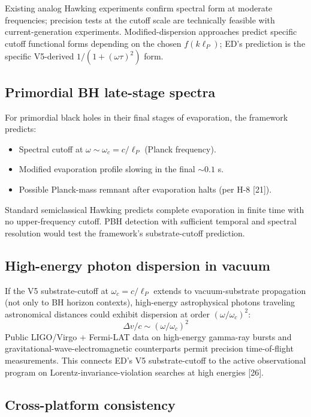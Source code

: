 \documentclass[11pt,a4paper]{article}
\begin{document}
Existing analog Hawking experiments confirm spectral form at moderate frequencies; precision tests at the cutoff scale are technically feasible with current-generation experiments. Modified-dispersion approaches predict specific cutoff functional forms depending on the chosen $f(k\ell_P)$; ED's prediction is the specific V5-derived $1/(1+(\omega\tau)^{2})$ form.

\subsection{Primordial BH late-stage spectra}

For primordial black holes in their final stages of evaporation, the framework predicts:
\begin{itemize}[noitemsep]
\item Spectral cutoff at $\omega \sim \omega_c = c/\ell_P$ (Planck frequency).
\item Modified evaporation profile slowing in the final $\sim 0.1$ s.
\item Possible Planck-mass remnant after evaporation halts (per H-8 [21]).
\end{itemize}

Standard semiclassical Hawking predicts complete evaporation in finite time with no upper-frequency cutoff. PBH detection with sufficient temporal and spectral resolution would test the framework's substrate-cutoff prediction.

\subsection{High-energy photon dispersion in vacuum}

If the V5 substrate-cutoff at $\omega_c = c/\ell_P$ extends to vacuum-substrate propagation (not only to BH horizon contexts), high-energy astrophysical photons traveling astronomical distances could exhibit dispersion at order $(\omega/\omega_c)^{2}$:
\[
\Delta v / c \sim (\omega/\omega_c)^{2}
\]
Public LIGO/Virgo + Fermi-LAT data on high-energy gamma-ray bursts and gravitational-wave-electromagnetic counterparts permit precision time-of-flight measurements. This connects ED's V5 substrate-cutoff to the active observational program on Lorentz-invariance-violation searches at high energies [26].

\subsection{Cross-platform consistency}
\end{document}
